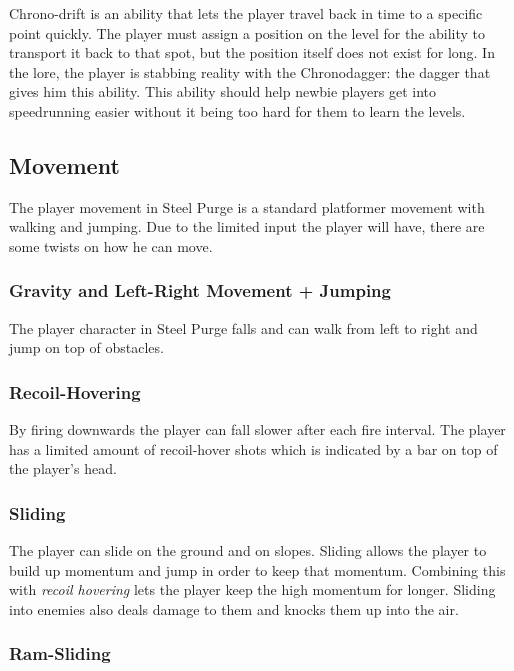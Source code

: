 \documentclass[12pt]{article}
\begin{document}
Chrono-drift is an ability that lets the player travel back in time to a specific point quickly. The player must assign a position on the level for the ability to transport it back to that spot, but the position itself does not exist for long. In the lore, the player is stabbing reality with the Chronodagger: the dagger that gives him this ability. This ability should help newbie players get into speedrunning easier without it being too hard for them to learn the levels.

\subsection{Movement}

The player movement in Steel Purge is a standard platformer movement with walking and jumping. Due to the limited input the player will have, there are some twists on how he can move.

\subsubsection{Gravity and Left-Right Movement + Jumping}

The player character in Steel Purge falls and can walk from left to right and jump on top of obstacles.

\subsubsection{Recoil-Hovering}

By firing downwards the player can fall slower after each fire interval. The player has a limited amount of recoil-hover shots which is indicated by a bar on top of the player's head. 

\subsubsection{Sliding}

The player can slide on the ground and on slopes. Sliding allows the player to build up momentum and jump in order to keep that momentum. Combining this with \emph{recoil hovering} lets the player keep the high momentum for longer. Sliding into enemies also deals damage to them and knocks them up into the air. 

\subsubsection{Ram-Sliding}
\end{document}
